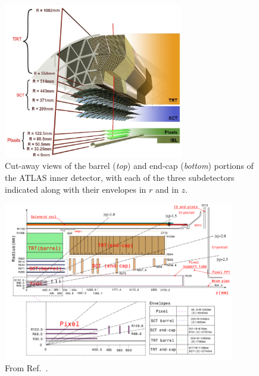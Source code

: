 \begin{figure}[!htb]
    \begin{center}
        \includegraphics[width=0.7\textwidth]{figures/chapter2/atlas_ID_barrel_exploded}
        \caption{
            Cut-away views of the barrel (\textit{top}) and end-cap (\textit{bottom}) portions
            of the ATLAS inner detector, with each of the three subdetectors indicated along with their
            envelopes in $r$ and in $z$.
        }
        \label{fig:atlas_ID_exploded}
    \end{center}
\end{figure}

\begin{figure}[!htb]
    \begin{center}
        \includegraphics[width=0.9\textwidth]{figures/chapter2/atlas_ID_plan_view}
        \caption{
            From Ref.~\cite{ATLASCollab}.
        }
        \label{fig:atlas_ID_plan_view}
    \end{center}
\end{figure}

